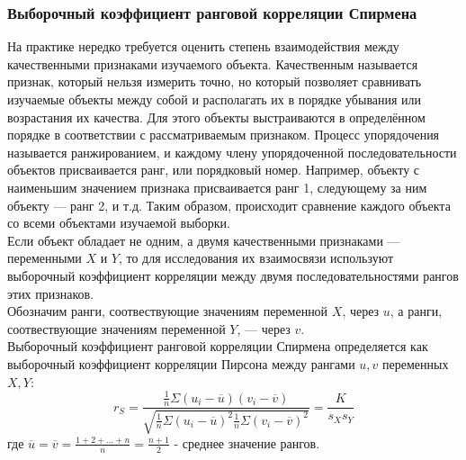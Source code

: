 \subsubsection{Выборочный коэффициент ранговой корреляции Спирмена}
На практике нередко требуется оценить степень взаимодействия между качественными признаками изучаемого объекта. Качественным называется признак, который нельзя измерить точно, но который позволяет сравнивать изучаемые объекты между собой и располагать их в порядке убывания или возрастания их качества. Для этого объекты выстраиваются в определённом порядке в соответствии с рассматриваемым признаком. Процесс упорядочения называется ранжированием, и каждому члену упорядоченной последовательности объектов присваивается ранг, или порядковый номер. Например, объекту с наименьшим значением признака присваивается ранг 1, следующему за ним объекту — ранг 2, и т.д. Таким образом, происходит сравнение каждого объекта со всеми объектами изучаемой выборки.\\
Если объект обладает не одним, а двумя качественными признаками — переменными $X$ и $Y$, то для исследования их взаимосвязи используют выборочный коэффициент корреляции между двумя последовательностями рангов этих признаков.\\
Обозначим ранги, соотвествующие значениям переменной $X$, через $u$, а ранги, соотвествующие значениям переменной $Y$, — через $v$.\\
Выборочный коэффициент ранговой корреляции Спирмена определяется как выборочный коэффициент корреляции Пирсона между рангами $u, v$ переменных $X, Y$:
\begin{equation}
r_S=\frac{\frac{1}{n}\Sigma (u_i-\overline{u})(v_i-\overline{v})}{\sqrt{\frac{1}{n}\Sigma (u_i-\overline{u})^2 \frac{1}{n}\Sigma (v_i-\overline{v})^2}}=\frac{K}{s_X s_Y}
\end{equation}
где $\overline{u}=\overline{v}=\frac{1+2+...+n}{n}=\frac{n+1}{2}$ - среднее значение рангов.

